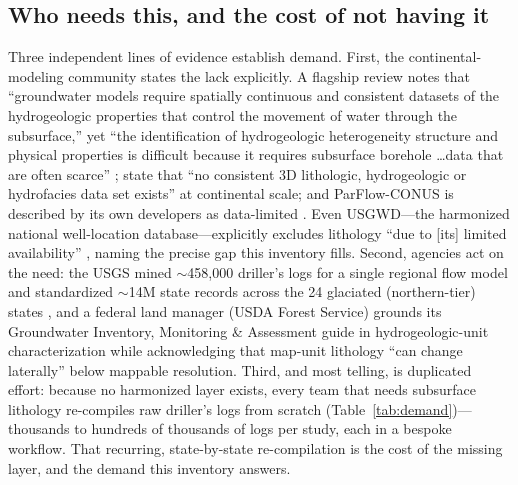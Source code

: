 \documentclass[12pt]{article}
\begin{document}
\subsection{Who needs this, and the cost of not having it}
\label{sec:demand}
Three independent lines of evidence establish demand. First, the continental-modeling community
states the lack explicitly. A flagship review notes that ``groundwater models require spatially continuous
and consistent datasets of the hydrogeologic properties that control the movement of water through the
subsurface,'' yet ``the identification of hydrogeologic heterogeneity structure and physical properties is
difficult because it requires subsurface borehole \ldots data that are often scarce''
\citep{condon2021}; \citet{degraaf2020} state that ``no consistent 3D lithologic, hydrogeologic or
hydrofacies data set exists'' at continental scale; and ParFlow-CONUS is described by its own developers as
data-limited \citep{oneill2021conus1}. Even USGWD---the harmonized national well-location
database---explicitly excludes lithology ``due to [its] limited availability'' \citep{lin2024usgwd},
naming the precise gap this inventory fills. Second, agencies act on the need: the USGS mined
$\sim$458{,}000 driller's logs for a single regional flow model \citep{arihood2009} and standardized
$\sim$14M state records across the 24 glaciated (northern-tier) states \citep{bayless2017}, and a federal land
manager (USDA Forest Service) grounds its Groundwater Inventory, Monitoring \& Assessment guide in
hydrogeologic-unit characterization while acknowledging that map-unit lithology ``can change laterally''
below mappable resolution. Third, and most telling, is duplicated effort: because no harmonized
layer exists, every team that needs subsurface lithology re-compiles raw driller's logs from scratch
(Table~\ref{tab:demand})---thousands to hundreds of thousands of logs per study, each in a bespoke
workflow. That recurring, state-by-state re-compilation is the cost of the missing layer, and the demand
this inventory answers.
\end{document}
